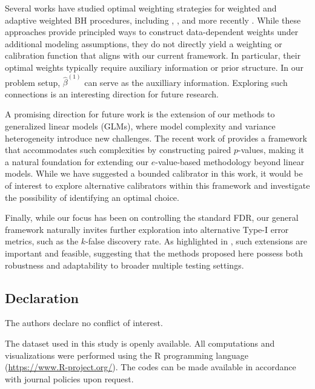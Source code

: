 \documentclass[11pt]{article}
\numberwithin{equation}{section}
\theoremstyle{plain}
\theoremstyle{remark}
\begin{document}
Several works have studied optimal weighting strategies for weighted and adaptive weighted BH procedures, including \citet{roeder2009genome}, \citet{Habiger2017adaptive}, and more recently \citet{zheng2024fdr}. While these approaches provide principled ways to construct data-dependent weights under additional modeling assumptions, they do not directly yield a weighting or calibration function that aligns with our current framework. In particular, their optimal weights typically require auxiliary information or prior structure. In our problem setup, $\hat{\beta}^{(1)}$ can serve as the auxilliary information. Exploring such connections is an interesting direction for future research. 

A promising direction for future work is the extension of our methods to generalized linear models (GLMs), where model complexity and variance heterogeneity introduce new challenges. The recent work of \citet{rilling2025new} provides a framework that accommodates such complexities by constructing paired $p$-values, making it a natural foundation for extending our $e$-value-based methodology beyond linear models. While we have suggested a bounded calibrator in this work, it would be of interest to explore alternative calibrators within this framework and investigate the possibility of identifying an optimal choice.  

Finally, while our focus has been on controlling the standard FDR, our general framework naturally invites further exploration into alternative Type-I error metrics, such as the $k$-false discovery rate. As highlighted in \citet{sarkar2022adjusting}, such extensions are important and feasible, suggesting that the methods proposed here possess both robustness and adaptability to broader multiple testing settings.

\subsection*{Declaration} 
The authors declare no conflict of interest.

The dataset used in this study is openly available. All computations and visualizations were performed using the \textsf{R} programming language (\url{https://www.R-project.org/}). The codes can be made available in accordance with journal policies upon request.


\end{document}
